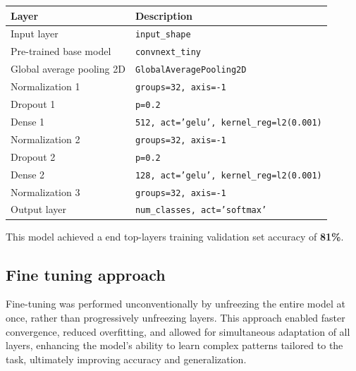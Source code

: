 \documentclass[11pt]{article}
\begin{document}
\begin{multicols}{2}
        \begin{table}[H]
            \centering
            \small
            \begin{tabular}{|l|p{3.9cm}|}
                \hline
                \textbf{Layer} & \textbf{Description} \\ \hline
                Input layer & \texttt{input\_shape} \\ \hline
                Pre-trained base model & \texttt{convnext\_tiny} \\ \hline
                Global average pooling 2D & \texttt{GlobalAveragePooling2D} \\ \hline
                Normalization 1 & \texttt{groups=32, axis=-1} \\ \hline
                Dropout 1 & \texttt{p=0.2} \\ \hline
                Dense 1 & \texttt{512, act='gelu', kernel\_reg=l2(0.001)} \\ \hline
                Normalization 2 & \texttt{groups=32, axis=-1} \\ \hline
                Dropout 2 & \texttt{p=0.2} \\ \hline
                Dense 2 & \texttt{128, act='gelu', kernel\_reg=l2(0.001)} \\ \hline
                Normalization 3 & \texttt{groups=32, axis=-1} \\ \hline
                Output layer & \texttt{num\_classes, act='softmax'} \\ \hline
            \end{tabular}
        \end{table}
        
        This model achieved a end top-layers training validation set accuracy of \textbf{81\%}.
        
        \subsection{Fine tuning approach}
        
        Fine-tuning was performed unconventionally by unfreezing the entire model at once, rather than progressively unfreezing layers. This approach enabled faster convergence, reduced overfitting, and allowed for simultaneous adaptation of all layers, enhancing the model's ability to learn complex patterns tailored to the task, ultimately improving accuracy and generalization.
        

\end{multicols}
\end{document}
